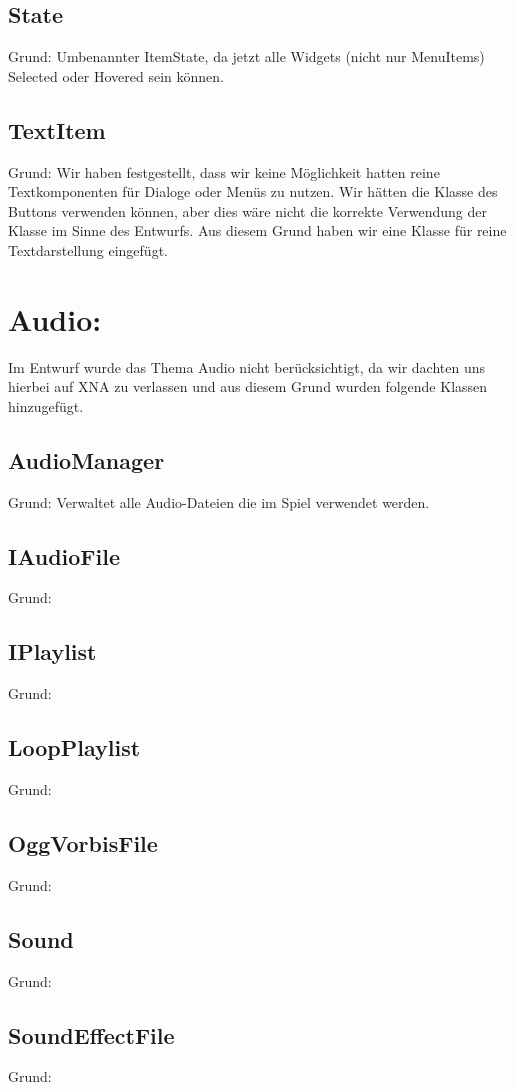 \subsection{State}
Grund: Umbenannter ItemState, da jetzt alle Widgets (nicht nur MenuItems) Selected oder Hovered sein können.
\subsection{TextItem}
Grund: Wir haben festgestellt, dass wir keine Möglichkeit hatten reine Textkomponenten für Dialoge oder Menüs zu nutzen. Wir hätten die Klasse des Buttons verwenden können, aber dies wäre nicht die korrekte Verwendung der Klasse im Sinne des Entwurfs. Aus diesem Grund haben wir eine Klasse für reine Textdarstellung eingefügt.

\section{Audio:}
Im Entwurf wurde das Thema Audio nicht berücksichtigt, da wir dachten uns hierbei auf XNA zu verlassen und aus diesem Grund wurden folgende Klassen hinzugefügt.
\subsection{AudioManager}
Grund: Verwaltet alle Audio-Dateien die im Spiel verwendet werden. 
\subsection{IAudioFile}
Grund:
\subsection{IPlaylist}
Grund:
\subsection{LoopPlaylist}
Grund:
\subsection{OggVorbisFile}
Grund:
\subsection{Sound}
Grund:
\subsection{SoundEffectFile}
Grund:


